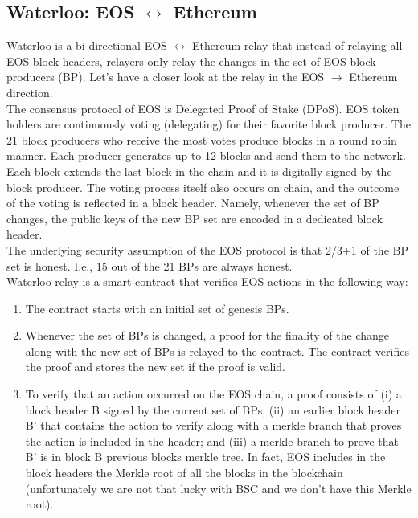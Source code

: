 \subsection{Waterloo:  EOS $\leftrightarrow$ Ethereum}
Waterloo is a bi-directional EOS $\leftrightarrow$ Ethereum relay that instead of relaying all EOS block headers, relayers only relay the changes in the set of EOS block producers (BP). Let's have a closer look at the relay in the EOS $\rightarrow$ Ethereum direction.\\The consensus protocol of EOS is Delegated Proof of Stake (DPoS). EOS token holders are continuously voting (delegating) for their favorite block producer. The 21 block producers who receive the most votes produce blocks in a round robin manner. Each producer generates up to 12 blocks and send them to the network. Each block extends the last block in the chain and it is digitally signed by the block producer. The voting process itself also occurs on chain, and the outcome of the voting is reflected in a block header. Namely, whenever the set of BP changes, the public keys of the new BP set are encoded in a dedicated block header. \\The underlying security assumption of the EOS protocol is that 2/3+1 of the BP set is honest. I.e., 15 out of the 21 BPs are always honest. \\Waterloo relay is a smart contract that verifies EOS actions in the following way:
\begin{enumerate}
    \item The contract starts with an initial set of genesis BPs.
    \item Whenever the set of BPs is changed, a proof for the finality of the change along with the new set of BPs is relayed to the contract. The contract verifies the proof and stores the new set if the proof is valid.
    \item To verify that an action occurred on the EOS chain, a proof consists of (i) a block header B signed by the current set of BPs; (ii) an earlier block header B’ that contains the action to verify along with a merkle branch that proves the action is included in the header; and (iii) a merkle branch to prove that B’ is in block B previous blocks merkle tree. In fact, EOS includes in the block headers the Merkle root of all the blocks in the blockchain (unfortunately we are not that lucky with BSC and we don't have this Merkle root).
\end{enumerate}


